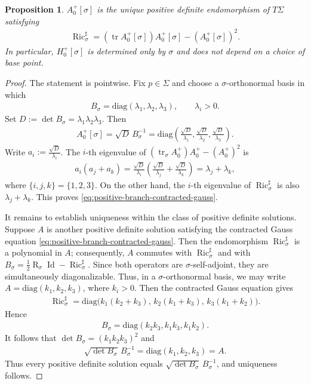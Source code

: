 \documentclass[10pt,a4paper]{amsart}
\newcommand{\tr}{\operatorname{tr}}
\newcommand{\Ric}{\operatorname{Ric}}
\newcommand{\Id}{\operatorname{Id}}
\newcommand{\Scal}{\operatorname{R}}
\newcommand{\diag}{\mathrm{diag}}
\newtheorem{proposition}[theorem]{Proposition}
\begin{document}
	\begin{proposition}\label{prop:positive-reference-branch}
		$A_0^+[\sigma]$ is the unique positive definite endomorphism of $T\Sigma$
		satisfying
		\begin{align}\label{eq:positive-branch-contracted-gauss}
			\Ric_\sigma^\sharp
			=
			(\tr A_0^+[\sigma])A_0^+[\sigma]
			-
			(A_0^+[\sigma])^2 .
		\end{align}
		In particular, $H_0^+[\sigma]$ is determined only by $\sigma$ and does not
		depend on a choice of base point.
	\end{proposition}
	
	\begin{proof}
		The statement is pointwise. Fix $p\in\Sigma$ and choose a
		$\sigma$-orthonormal basis in which
		\begin{align*}
			B_\sigma
			=
			\diag(\lambda_1,\lambda_2,\lambda_3),
			\qquad
			\lambda_i>0 .
		\end{align*}
		Set $D:=\det B_\sigma=\lambda_1\lambda_2\lambda_3$. Then
		\begin{align*}
			A_0^+[\sigma]
			=
			\sqrt D\,B_\sigma^{-1}
			=
			\diag\left(
			\frac{\sqrt D}{\lambda_1},
			\frac{\sqrt D}{\lambda_2},
			\frac{\sqrt D}{\lambda_3}
			\right).
		\end{align*}
		Write $a_i:=\tfrac{\sqrt D}{\lambda_i}$. The $i$-th eigenvalue of
		$(\tr_\sigma A_0^+)A_0^+-(A_0^+)^2$ is
		\begin{align*}
			a_i(a_j+a_k)
			=
			\frac{\sqrt D}{\lambda_i}
			\left(
			\frac{\sqrt D}{\lambda_j}
			+
			\frac{\sqrt D}{\lambda_k}
			\right)
			=
			\lambda_j+\lambda_k,
		\end{align*}
		where $\{i,j,k\}=\{1,2,3\}$. On the other hand, the $i$-th eigenvalue of $\Ric_\sigma^\sharp$ is also
		$\lambda_j+\lambda_k$. This proves \eqref{eq:positive-branch-contracted-gauss}.
		
		It remains to establish uniqueness within the class of positive definite solutions. Suppose $A$ is another positive definite solution satisfying the contracted Gauss equation \eqref{eq:positive-branch-contracted-gauss}. Then the endomorphism $\Ric_\sigma^\sharp$ is a polynomial in $A$; consequently, $A$ commutes with $\Ric_\sigma^\sharp$ and with $B_\sigma=\frac12\Scal_\sigma\Id-\Ric_\sigma^\sharp$. Since both operators are $\sigma$-self-adjoint, they are simultaneously diagonalizable. Thus, in a $\sigma$-orthonormal basis, we may write $A=\diag(k_1,k_2,k_3)$, where $k_i>0$. Then the contracted Gauss equation gives
		\begin{align*}
			\Ric_\sigma^\sharp
			=
			\diag\bigl(k_1(k_2+k_3),\,k_2(k_1+k_3),\,k_3(k_1+k_2)\bigr).
		\end{align*}
		Hence
		\begin{align*}
			B_\sigma
			=
			\diag(k_2k_3,k_1k_3,k_1k_2).
		\end{align*}
		It follows that $\det B_\sigma=(k_1k_2k_3)^2$ and
		\begin{align*}
			\sqrt{\det B_\sigma}\,B_\sigma^{-1}
			=
			\diag(k_1,k_2,k_3)=A .
		\end{align*}
		Thus every positive definite solution equals
		$\sqrt{\det B_\sigma}\,B_\sigma^{-1}$, and uniqueness follows.
	\end{proof}
	
\end{document}

